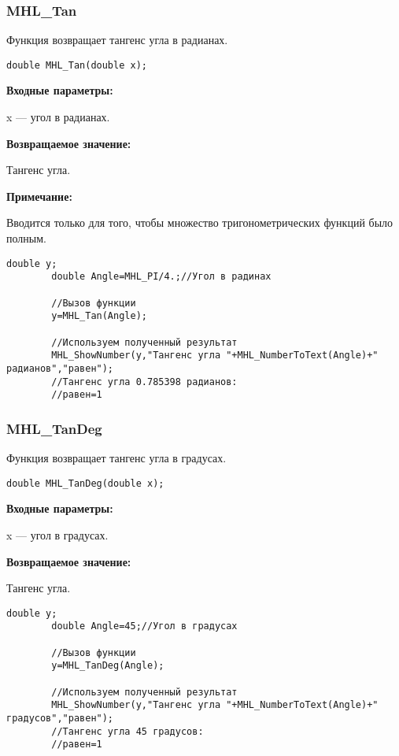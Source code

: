 \documentclass[a4paper,12pt]{article}
\begin{document}
\subsubsection{MHL\_Tan}\label{MHL_Tan}

Функция возвращает тангенс угла в радианах.


\begin{lstlisting}[label=code_syntax_MHL_Tan,caption=Синтаксис]
double MHL_Tan(double x);
\end{lstlisting}

\textbf{Входные параметры:}

 x --- угол в радианах.

\textbf{Возвращаемое значение:}

Тангенс угла.

\textbf{Примечание:}

 Вводится только для того, чтобы множество тригонометрических функций было полным.


\begin{lstlisting}[label=code_use_MHL_Tan,caption=Пример использования]
        double y;
        double Angle=MHL_PI/4.;//Угол в радинах

        //Вызов функции
        y=MHL_Tan(Angle);

        //Используем полученный результат
        MHL_ShowNumber(y,"Тангенс угла "+MHL_NumberToText(Angle)+" радианов","равен");
        //Тангенс угла 0.785398 радианов:
        //равен=1
\end{lstlisting}

\subsubsection{MHL\_TanDeg}\label{MHL_TanDeg}

Функция возвращает тангенс угла в градусах.


\begin{lstlisting}[label=code_syntax_MHL_TanDeg,caption=Синтаксис]
double MHL_TanDeg(double x);
\end{lstlisting}

\textbf{Входные параметры:}

 x --- угол в градусах.

\textbf{Возвращаемое значение:}

Тангенс угла.


\begin{lstlisting}[label=code_use_MHL_TanDeg,caption=Пример использования]
        double y;
        double Angle=45;//Угол в градусах

        //Вызов функции
        y=MHL_TanDeg(Angle);

        //Используем полученный результат
        MHL_ShowNumber(y,"Тангенс угла "+MHL_NumberToText(Angle)+" градусов","равен");
        //Тангенс угла 45 градусов:
        //равен=1
\end{lstlisting}
\end{document}
